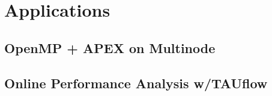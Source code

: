 
\section{Applications}


\subsection{OpenMP + APEX on Multinode}


\subsection{Online Performance Analysis w/TAUflow}




